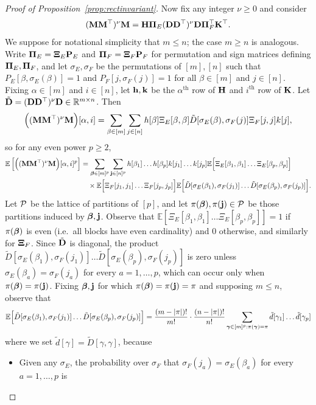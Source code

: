 \documentclass[10pt,reqno]{amsart}
\def\E{\mathbb{E}}
\def\R{\mathbb{R}}
\begin{document}
\begin{proof}[Proof of Proposition~\ref{prop:rectinvariant}]
Now fix any integer $\nu \geq 0$ and consider
\[(\mathbf{M}\mathbf{M}^\top)^\nu \mathbf{M}=\mathbf{H}\bm{\Pi}_E(\mathbf{D}\mathbf{D}^\top)^\nu \mathbf{D}\bm{\Pi}_F^\top \mathbf{K}^\top.\]
We suppose for notational simplicity that $m \leq n$; the case $m \geq n$ is
analogous. Write $\bm{\Pi}_E=\bm{\Xi}_E\mathbf{P}_E$ and $\bm{\Pi}_F=\bm{\Xi}_F\mathbf{P}_F$ for
permutation and sign matrices defining $\bm{\Pi}_E,\bm{\Pi}_F$, and let
$\sigma_E,\sigma_F$ be the permutations of $[m],[n]$ such that
$P_E[\beta,\sigma_E(\beta)]=1$
and $P_F[j,\sigma_F(j)]=1$ for all $\beta \in [m]$ and $j \in [n]$.
Fixing $\alpha \in [m]$ and $i \in [n]$, let $\mathbf{h},\mathbf{k}$ be the
$\alpha^\text{th}$ row of $\mathbf{H}$ and $i^\text{th}$ row of $\mathbf{K}$.
Let $\tilde{\bD}=(\bD\bD^\top)^\nu \bD \in \R^{m \times n}$. Then
\[\Big((\mathbf{M}\mathbf{M}^\top)^\nu \mathbf{M}\Big)[\alpha,i]
=\sum_{\beta \in [m]} \sum_{j \in [n]} h[\beta] \Xi_E[\beta,\beta]
\tilde{D}[\sigma_E(\beta),\sigma_F(j)]\Xi_F[j,j]k[j],\]
so for any even power $p \geq 2$,
\begin{align*}
\E\left[\Big((\bM\bM^\top)^\nu \bM\Big)[\alpha,i]^p\right]
&=\sum_{\bbeta \in [m]^p} \sum_{\bj \in [n]^p}
h[\beta_1]\ldots h[\beta_p]k[j_1]\ldots k[j_p]
\E\Big[\Xi_E[\beta_1,\beta_1]\ldots \Xi_E[\beta_p,\beta_p]\Big]\\
&\quad\times \E\Big[\Xi_F[j_1,j_1]\ldots \Xi_F[j_p,j_p]\Big]
\E\Big[\tilde{D}[\sigma_E(\beta_1),\sigma_F(j_1)]
\ldots \tilde{D}[\sigma_E(\beta_p),\sigma_F(j_p)]\Big].
\end{align*}
Let $\mathcal{P}$ be the lattice of partitions of $[p]$, and let $\pi(\bm{\beta}),\pi(\mathbf{j})
\in \mathcal{P}$ be those partitions induced by $\bm{\beta},\mathbf{j}$.
Observe that $\E[\Xi_E[\beta_1,\beta_1]\ldots \Xi_E[\beta_p,\beta_p]]=1$ if
$\pi(\bm{\beta})$ is even (i.e.\ all blocks have even cardinality) and 0 otherwise,
and similarly for $\bm{\Xi}_F$. Since
$\tilde {\mathbf{D}}$ is diagonal, the product $\tilde
D[\sigma_E(\beta_1),\sigma_F(j_1)]\ldots \tilde D[\sigma_E(\beta_p),\sigma_F(j_p)]$
is zero unless $\sigma_E(\beta_a)=\sigma_F(j_a)$ for every $a=1,\ldots,p$,
which can occur only when $\pi(\bm{\beta})=\pi(\mathbf{j})$. Fixing $\bm{\beta},\mathbf{j}$ for which
$\pi(\bm{\beta})=\pi(\mathbf{j})=\pi$ and supposing $m \leq n$, observe that
\[\E\Big[\tilde{D}[\sigma_E(\beta_1),\sigma_F(j_1)]
\ldots \tilde{D}[\sigma_E(\beta_p),\sigma_F(j_p)]\Big]
=\frac{(m-|\pi|)!}{m!} \cdot \frac{(n-|\pi|)!}{n!}
\sum_{\bgamma \in [m]^p:\pi(\bgamma)=\pi} \tilde d[\gamma_1]
\ldots \tilde d[\gamma_p]\]
where we set $\tilde d[\gamma]=\tilde D[\gamma,\gamma]$, because
\begin{itemize}
\item Given any $\sigma_E$,
the probability over $\sigma_F$ that
$\sigma_F(j_a)=\sigma_E(\beta_a)$ for every $a=1,\ldots,p$ is

\end{itemize}
\end{proof}
\end{document}
